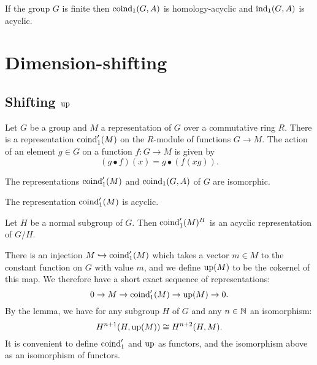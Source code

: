 \begin{corollary}
	If the group $G$ is finite then $\mathrm{coind}_1(G,A)$ is homology-acyclic
	and $\mathrm{ind}_1(G,A)$ is acyclic.
\end{corollary}




\section{Dimension-shifting}

\subsection{Shifting $\mathrm{up}$}

\begin{definition}
	Let $G$ be a group and $M$ a representation of $G$ over a commutative ring $R$.
	There is a representation $\mathrm{coind}_1' (M)$ on the $R$-module of
	functions $G \to M$.
	The action of an element $g \in G$ on a function $f : G \to M$ is given by
	\[
		(g \bullet f)(x) = g \bullet (f (xg)).
	\]
\end{definition}

\begin{lemma}
	The representations $\mathrm{coind}_1'(M)$ and $\mathrm{coind}_1(G,A)$ of $G$ are isomorphic.
\end{lemma}

\begin{corollary}
	The representation $\mathrm{coind}_1'(M)$ is acyclic.
\end{corollary}

\begin{corollary}
	Let $H$ be a normal subgroup of $G$. Then $\mathrm{coind}_1'(M)^H$ is an acyclic representation of $G/H$.
\end{corollary}

\begin{definition}
	There is an injection $M \hookrightarrow \mathrm{coind}_1'(M)$ which takes a vector $m \in M$
	to the constant function on $G$ with value $m$, and we define $\mathrm{up}(M)$ to be the cokernel of this map.
	We therefore have a short exact sequence of representations:
	\[
		0 \to M \to \mathrm{coind}_1'(M) \to \mathrm{up}(M) \to 0.
	\]
	By the lemma, we have for any subgroup $H$ of $G$ and any $n \in {\mathbb N}$ an isomorphism:
	\[
		H^{n+1}(H,\mathrm{up}(M)) \cong H^{n+2}(H,M).
	\]
	It is convenient to define $\mathrm{coind}_1'$ and $\mathrm{up}$ as functors, and the isomorphism
	above as an isomorphism of functors.
\end{definition}



